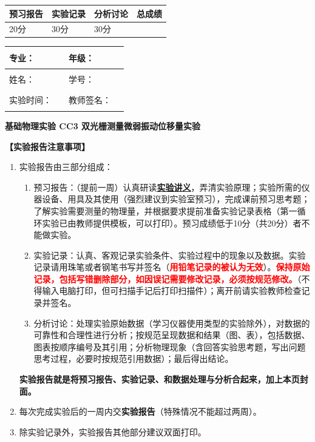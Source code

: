 \documentclass[dvipsnames, svgnames,a4paper,11pt]{article}
\begin{document}
\begin{table}
	\renewcommand\arraystretch{1.7}
	\begin{tabularx}{\textwidth}{
		|X|X|X|X
		|X|X|X|X|}
	\hline
	\multicolumn{2}{|c|}{预习报告}&\multicolumn{2}{|c|}{实验记录}&\multicolumn{2}{|c|}{分析讨论}&\multicolumn{2}{|c|}{总成绩}\\
	\hline
20分	& & 30分& & 30分& & & \\
	\hline
	\end{tabularx}
\end{table}


\begin{table}
	\renewcommand\arraystretch{1.7}
	\begin{tabularx}{\textwidth}{|X|X|X|X|}
	\hline
	专业：& \rule{2.5cm}{0.4pt} &年级：& \rule{2.5cm}{0.4pt} \\
	\hline
	姓名：& \rule{2.5cm}{0.4pt}   & 学号： & \rule{3cm}{0.4pt}\\
	\hline
	实验时间：& \rule{3cm}{0.4pt} & 教师签名：& \rule{3cm}{0.4pt} \\
	\hline
	\end{tabularx}
\end{table}

\begin{center}
	\LARGE \textbf{基础物理实验 \quad CC3 双光栅测量微弱振动位移量实验}
\end{center}

\textbf{【实验报告注意事项】}
\begin{enumerate}
	\item 实验报告由三部分组成：
	\begin{enumerate}
		\item 预习报告：（提前一周）认真研读\underline{\textbf{实验讲义}}，弄清实验原理；实验所需的仪器设备、用具及其使用（强烈建议到实验室预习），完成课前预习思考题；了解实验需要测量的物理量，并根据要求提前准备实验记录表格（第一循环实验已由教师提供模板，可以打印）。预习成绩低于10分（共20分）者不能做实验。
	    \item 实验记录：认真、客观记录实验条件、实验过程中的现象以及数据。实验记录请用珠笔或者钢笔书写并签名（\textcolor{red}{\textbf{用铅笔记录的被认为无效}}）。\textcolor{red}{\textbf{保持原始记录，包括写错删除部分，如因误记需要修改记录，必须按规范修改。}}（不得输入电脑打印，但可扫描手记后打印扫描件）；离开前请实验教师检查记录并签名。
	    \item 分析讨论：处理实验原始数据（学习仪器使用类型的实验除外），对数据的可靠性和合理性进行分析；按规范呈现数据和结果（图、表），包括数据、图表按顺序编号及其引用；分析物理现象（含回答实验思考题，写出问题思考过程，必要时按规范引用数据）；最后得出结论。
	\end{enumerate}
	\textbf{实验报告就是将预习报告、实验记录、和数据处理与分析合起来，加上本页封面。}
	\item 每次完成实验后的一周内交\textbf{实验报告}（特殊情况不能超过两周）。
	\item 除实验记录外，实验报告其他部分建议双面打印。
\end{enumerate}
\end{document}
